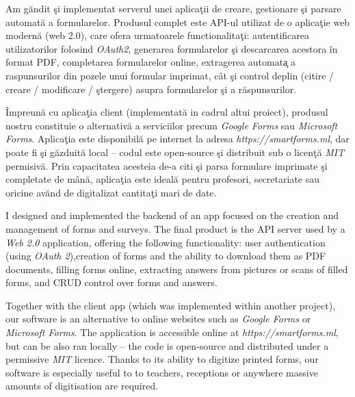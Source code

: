 \documentclass[12pt, a4paper]{report}
\newenvironment{abstractpage}
  {\cleardoublepage\vspace*{\fill}\thispagestyle{empty}}
  {\vfill\cleardoublepage}
\renewenvironment{abstract}[1]
  {\bigskip
  \begin{center}\bfseries\abstractname\end{center}}
  {\par\bigskip}
\begin{document}
\begin{abstractpage}

  \begin{abstract}{}
  Am g\u{a}ndit \c{s}i implementat serverul unei aplica\c{t}ii de creare, gestionare \c{s}i parsare automat\u{a} a formularelor. Produsul complet este API-ul utilizat de o aplica\c{t}ie web modern\u{a} (web 2.0), care ofera urmatoarele functionalita\c{t}i: autentificarea utilizatorilor folosind \textit{OAuth2}, generarea formularelor \c{s}i descarcarea acestora \^{i}n format PDF, completarea formularelor online, extragerea automat\c{a} a raspunsurilor din pozele unui formular imprimat, c\^{a}t \c{s}i control deplin (citire / creare / modificare / \c{s}tergere) asupra formularelor \c{s}i a r\u{a}spunsurilor.
  
  \^{I}mpreun\u{a} cu aplica\c{t}ia client (implementat\u{a} in cadrul altui proiect), produsul nostru constituie o alternativ\u a a serviciilor precum \textit{Google Forms} sau \textit{Microsoft Forms}. Aplica\c tia este disponibil\u a pe internet la adresa \textit{https://smartforms.ml}, dar poate fi \c si g\u azduit\u a local -- codul este open-source \c si distribuit sub o licen\c t\u a \textit{MIT} permisiv\u a. Prin capacitatea acesteia de-a citi \c si parsa formulare imprimate \c si completate de m\^ an\u a, aplica\c tia este ideal\u a pentru profesori, secretariate sau oricine av\u and de digitalizat cantita\c ti mari de date. 
  
  \end{abstract}
  
  \begin{abstract}{}
  I designed and implemented the backend of an app focused on the creation and management of forms and surveys. The final product is the API server used by a \textit{Web 2.0} application, offering the following functionality: user authentication (using \textit{OAuth 2}),creation of forms and the ability to download them as PDF documents, filling forms online, extracting answers from pictures or scans of filled forms, and CRUD control over forms and answers.
  
  Together with the client app (which was implemented within another project), our software is an alternative to online websites such as \textit{Google Forms} or \textit{Microsoft Forms}. The application is accessible online at \textit{https://smartforms.ml}, but can be also ran locally -- the code is open-source and distributed under a permissive \textit{MIT} licence. Thanks to its ability to digitize printed forms, our software is especially useful to to teachers, receptions or anywhere massive amounts of digitisation are required.
  \end{abstract}
  
\end{abstractpage}
\end{document}
